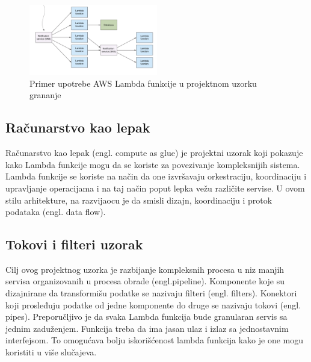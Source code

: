 \documentclass[12pt,oneside]{memoir}
\begin{document}
\begin{figure}[!ht]
  \centering
  \includegraphics[width=0.5\textwidth]{Slika 15.png}
  \caption{Primer upotrebe AWS Lambda funkcije u projektnom uzorku grananje}
  \label{fig:grananje}
\end{figure}

\subsection{Računarstvo kao lepak} %
Računarstvo kao lepak (engl. compute as glue) je projektni uzorak koji pokazuje kako Lambda funkcije mogu da se koriste za povezivanje kompleksnijih sistema. Lambda funkcije se koriste na način da one izvršavaju orkestraciju, koordinaciju i upravljanje operacijama i na taj način poput lepka vežu različite servise. U ovom stilu arhitekture, na razvijaocu je da smisli dizajn, koordinaciju i protok podataka (engl. data flow). 
 
\subsection{Tokovi i filteri uzorak}
Cilj ovog projektnog uzorka je razbijanje kompleksnih procesa u niz manjih servisa organizovanih u procesa obrade (engl.pipeline). Komponente koje su dizajnirane da transformišu podatke se nazivaju filteri (engl. filters). Konektori koji prosleđuju podatke od jedne komponente do druge se nazivaju tokovi (engl. pipes). Preporučljivo je da svaka Lambda funkcija bude granularan servis sa jednim zaduženjem. Funkcija treba da ima jasan ulaz i izlaz sa jednostavnim interfejsom. To omogućava bolju iskorišćenost lambda funkcija kako je one mogu koristiti u više slučajeva.

\end{document}
